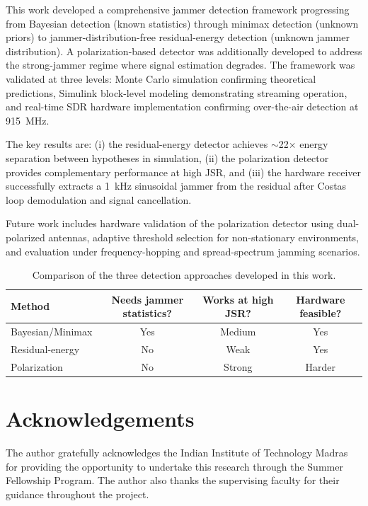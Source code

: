 \documentclass{article}
\begin{document}
This work developed a comprehensive jammer detection framework progressing from Bayesian detection (known statistics) through minimax detection (unknown priors) to jammer-distribution-free residual-energy detection (unknown jammer distribution). A polarization-based detector was additionally developed to address the strong-jammer regime where signal estimation degrades. The framework was validated at three levels: Monte Carlo simulation confirming theoretical predictions, Simulink block-level modeling demonstrating streaming operation, and real-time SDR hardware implementation confirming over-the-air detection at 915~MHz.

The key results are: (i) the residual-energy detector achieves $\sim$22$\times$ energy separation between hypotheses in simulation, (ii) the polarization detector provides complementary performance at high JSR, and (iii) the hardware receiver successfully extracts a 1~kHz sinusoidal jammer from the residual after Costas loop demodulation and signal cancellation.

Future work includes hardware validation of the polarization detector using dual-polarized antennas, adaptive threshold selection for non-stationary environments, and evaluation under frequency-hopping and spread-spectrum jamming scenarios.

\begin{table}[H]
\centering
\caption{Comparison of the three detection approaches developed in this work.}
\label{tab:comparison}
\begin{tabular}{|l|c|c|c|}
\hline
\textbf{Method} & \textbf{Needs jammer statistics?} & \textbf{Works at high JSR?} & \textbf{Hardware feasible?} \\
\hline
Bayesian/Minimax & Yes & Medium & Yes \\
\hline
Residual-energy & No & Weak & Yes \\
\hline
Polarization & No & Strong & Harder \\
\hline
\end{tabular}
\end{table}


\section*{Acknowledgements}

The author gratefully acknowledges the Indian Institute of Technology Madras for providing the opportunity to undertake this research through the Summer Fellowship Program. The author also thanks the supervising faculty for their guidance throughout the project.
\end{document}
